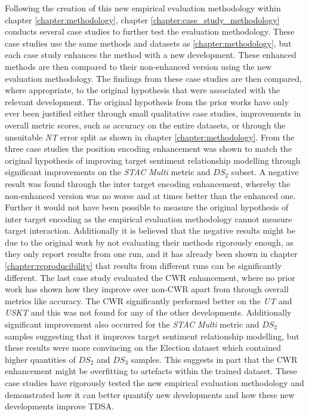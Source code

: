 Following the creation of this new empirical evaluation methodology within chapter \ref{chapter:methodology}, chapter \ref{chapter:case_study_methodology} conducts several case studies to further test the evaluation methodology. These case studies use the same methods and datasets as \ref{chapter:methodology}, but each case study enhances the method with a new development. These enhanced methods are then compared to their non-enhanced version using the new evaluation methodology. The findings from these case studies are then compared, where appropriate, to the original hypothesis that were associated with the relevant development. The original hypothesis from the prior works have only ever been justified either through small qualitative case studies, improvements in overall metric scores, such as accuracy on the entire datasets, or through the unsuitable \textit{NT} error split as shown in chapter \ref{chapter:methodology}. From the three case studies the position encoding enhancement was shown to match the original hypothesis of improving target sentiment relationship modelling through significant improvements on the \textit{STAC Multi} metric and $DS_2$ subset. A negative result was found through the inter target encoding enhancement, whereby the non-enhanced version was no worse and at times better than the enhanced one. Further it would not have been possible to measure the original hypothesis of inter target encoding as the empirical evaluation methodology cannot measure target interaction. Additionally it is believed that the negative results might be due to the original work by \citet{hazarika-etal-2018-modeling} not evaluating their methods rigorously enough, as they only report results from one run, and it has already been shown in chapter \ref{chapter:reproducibility} that results from different runs can be significantly different. The last case study evaluated the CWR enhancement, where no prior work has shown how they improve over non-CWR apart from through overall metrics like accuracy. The CWR significantly performed better on the \textit{UT} and \textit{USKT} and this was not found for any of the other developments. Additionally significant improvement also occurred for the \textit{STAC Multi} metric and $DS_2$ samples suggesting that it improves target sentiment relationship modelling, but these results were more convincing on the Election dataset which contained higher quantities of $DS_2$ and $DS_3$ samples. This suggests in part that the CWR enhancement might be overfitting to artefacts within the trained dataset. These case studies have rigorously tested the new empirical evaluation methodology and demonstrated how it can better quantify new developments and how these new developments improve TDSA. 

